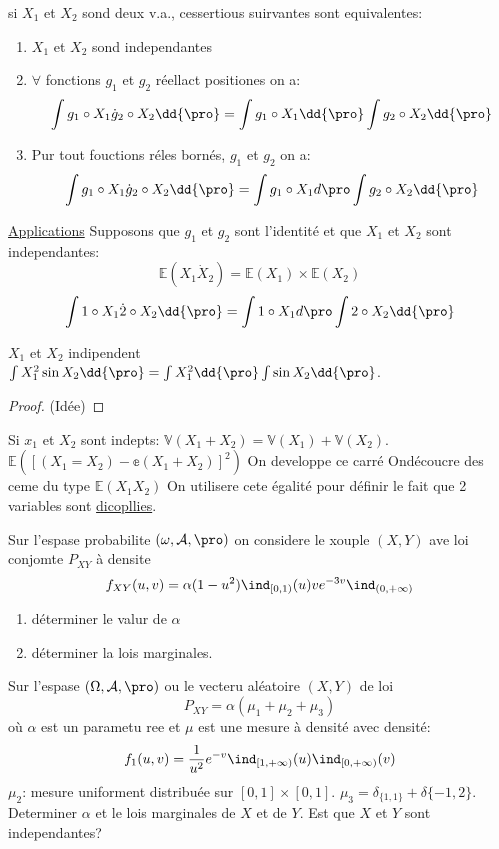 \begin{proposition}
	si $X_1$ et $X_2$ sond deux v.a., cessertious suirvantes sont equivalentes:
	\begin{enumerate}
		\item $X_1$ et $X_2$ sond independantes
		\item $\forall$ fonctions $g_1$ et $g_2$ réellact positiones on a:
			$$\int g_1\circ X_1 \dot g_2\circ X_2\dd{\pro}= \int g_1\circ X_1 \dd{\pro}\int g_2\circ X_2\dd{\pro}$$
		\item Pur tout fouctions réles bornés, $g_1$ et $g_2$ on a:
			$$\int g_1\circ X_1 \dot g_2\circ X_2\dd{\pro}= \int g_1\circ X_1 d{\pro}\int g_2\circ X_2\dd{\pro}$$
	\end{enumerate}
\end{proposition}

\underline{Applications} Supposons que $g_1$ et $g_2$ sont l'identité et que $X_1$ et $X_2$ sont independantes:
	$$\mathbb{E}(X_1\dot X_2)=\mathbb{E}(X_1)\times\mathbb{E}(X_2)$$
	$$\int 1\circ X_1 \dot 2\circ X_2\dd{\pro}= \int 1\circ X_1 d{\pro}\int 2\circ X_2\dd{\pro}$$
	
\begin{examplebox}
	$X_1$ et $X_2$ indipendent $\int X_1^2 \sin X_2\dd{\pro}=\int X_1^2 \dd{\pro} \int \sin X_2\dd{\pro}$.
\end{examplebox}

\begin{proof}
	(Idée) %
\end{proof}

Si $x_1$ et $X_2$ sont indepts: $\mathbb{V}(X_1+X_2)=\mathbb{V}(X_1)+\mathbb{V}(X_2)$.
$\mathbb{E}([(X_1=X_2)-\mathbb{e}(X_1+X_2)]^2)$ On developpe ce carré Ondécoucre des ceme du type $\mathbb{E}(X_1X_2)$ On utilisere cete égalité pour définir le fait que 2 variables sont \underline{dicopllies}.

\begin{examplebox}
	Sur l'espase probabilite $(\omega, \mathcal{A}, \pro)$ on considere le xouple $(X, Y)$ ave loi conjomte $P_{XY}$ à densite
	$$f_{XY}(u,v)=\alpha(1-u^2)\ind_{[0,1)}(u)v e^{-3v}\ind_{(0, +\infty)}$$
	\begin{enumerate}
		\item déterminer le valur de $\alpha$
		\item déterminer la lois marginales.
	\end{enumerate}
\end{examplebox}

\begin{examplebox}
	Sur l'espase $(\Omega,\mathcal{A},\pro)$ ou le vecteru aléatoire $(X, Y)$ de loi
	$$P_{XY}=\alpha(\mu_1+\mu_2+\mu_3)$$
	où $\alpha$ est un parametu ree et $\mu$ est une mesure à densité avec densité:
		$$f_1(u, v)=\frac{1}{u^2}e^{-v}\ind_{[1,+\infty)}(u)\ind_{[0, +\infty)}(v)$$
	$\mu_2$: mesure uniforment distribuée sur $[0,1]\times[0,1]$. $\mu_3=\delta_{\{1,1\}}+\delta{\{-1,2\}}$. Determiner $\alpha$ et le lois marginales de $X$ et de $Y$. Est que $X$ et $Y$ sont independantes?
\end{examplebox}

